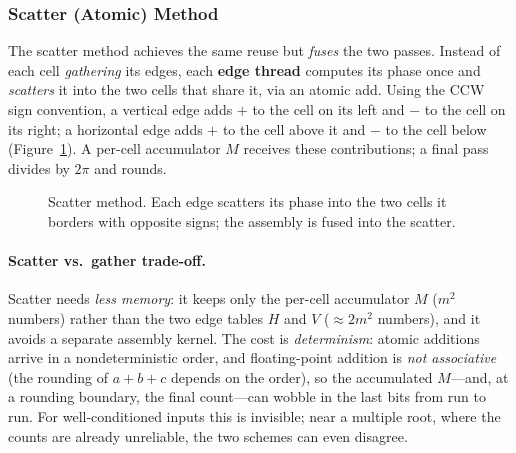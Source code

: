 \documentclass[11pt]{article}
\begin{document}
\subsubsection{Scatter (Atomic) Method}
The scatter method achieves the same reuse but \emph{fuses} the two passes.
Instead of each cell \emph{gathering} its edges, each \textbf{edge thread}
computes its phase once and \emph{scatters} it into the two cells that share it,
via an atomic add. Using the CCW sign convention, a vertical edge adds $+$ to
the cell on its left and $-$ to the cell on its right; a horizontal edge adds $+$
to the cell above it and $-$ to the cell below (Figure~\ref{fig:scatter}). A
per-cell accumulator $M$ receives these contributions; a final pass divides by
$2\pi$ and rounds.

\begin{figure}[h]
\centering
{}
\caption{Scatter method. Each edge scatters its phase into the two cells it
borders with opposite signs; the assembly is fused into the scatter.}
\label{fig:scatter}
\end{figure}

\paragraph{Scatter vs.\ gather trade-off.} Scatter needs \emph{less memory}: it
keeps only the per-cell accumulator $M$ ($m^2$ numbers) rather than the two edge
tables $H$ and $V$ ($\approx 2m^2$ numbers), and it avoids a separate assembly
kernel. The cost is \emph{determinism}: atomic additions arrive in a
nondeterministic order, and floating-point addition is \emph{not associative}
(the rounding of $a+b+c$ depends on the order), so the accumulated $M$---and, at
a rounding boundary, the final count---can wobble in the last bits from run to
run. For well-conditioned inputs this is invisible; near a multiple root, where
the counts are already unreliable, the two schemes can even disagree.
\end{document}
